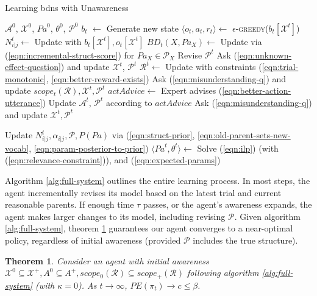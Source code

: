 \documentclass{article}
\newcommand{\bdn}{{\sc bdn}}
\newcommand{\Pa}{\mathit{Pa}}
\newtheorem{theorem}{Theorem}
\begin{document}
	\begin{algorithm}[t]
		\caption{Learning \bdn{}s with Unawareness}
		\label{alg:full-system}
		\begin{algorithmic}[1]
			 $\mathcal{A}^0$, $\mathcal{X}^0$, $\Pa^0$, $\theta^0$, $\mathcal{P}^0$
				\STATE $b_t$ $\gets$ Generate new state
				\STATE $\langle o_t, a_t, r_t \rangle \gets$ \textsc{$\epsilon$-greedy}($b_{t}[\mathcal{X}^t]$)
				\STATE $N^t_{i|j} \gets$ Update with $b_t[\mathcal{X}^t], o_t[\mathcal{X}^t]$
				\STATE $BD_t(X, \Pa_X) \gets$ Update via (\ref{eqn:incremental-struct-score}) for $\Pa_X \in \mathcal{P}_X$
					\STATE Revise $\mathcal{P}^t$
				\ENDIF
					\STATE Ask (\ref{eqn:unknown-effect-question}) and update $\mathcal{X}^t$, $\mathcal{P}^t$
				\ENDIF
				\STATE $\mathcal{R}^t \gets$ Update with constraints (\ref{eqn:trial-monotonic}, \ref{eqn:better-reward-exists})
					\STATE Ask (\ref{eqn:misunderstanding-q}) and update $scope_t(\mathcal{R}), \mathcal{X}^t, \mathcal{P}^t$
				\ENDIF
					\STATE $\mathit{actAdvice} \gets$ Expert advises (\ref{eqn:better-action-utterance})
					\STATE Update $\mathcal{A}^t$, $\mathcal{P}^t$ according to $\mathit{actAdvice}$
						\STATE Ask (\ref{eqn:misunderstanding-q}) and update $\mathcal{X}^t, \mathcal{P}^t$
						\ENDIF
				\ENDIF
				
					\STATE Update $N^t_{i|j}, \alpha_{i|j}, \mathcal{P}, P(\Pa)$ via (\ref{eqn:struct-prior},
					 \ref{eqn:old-parent-sets-new-vocab}, \ref{eqn:param-posterior-to-prior})
				\ENDIF
				\STATE $\langle \Pa^t, \theta^t \rangle \gets$ Solve (\ref{eqn:ilp}) (with (\ref{eqn:relevance-constraint})), and (\ref{eqn:expected-params})
				\ENDFOR
		\end{algorithmic}
	\end{algorithm}
	
	Algorithm \ref{alg:full-system} outlines the entire learning process. In most steps, the agent incrementally revises its model based on the latest trial and current reasonable parents. If enough time $\tau$ passes, or the agent's awareness expands, the agent makes larger changes to its model, including revising $\mathcal{P}$. Given algorithm \ref{alg:full-system}, theorem \ref{thm:full-unawareness-guarantee} guarantees our agent converges to a near-optimal policy, regardless of initial awareness  (provided $\mathcal{P}$ includes the true structure).
	\begin{theorem}
		\label{thm:full-unawareness-guarantee}
		Consider an agent with initial awareness $\mathcal{X}^0 \subseteq \mathcal{X}^+, A^0 \subseteq A^+ ,scope_0(\mathcal{R}) \subseteq scope_+(\mathcal{R})$ following algorithm \ref{alg:full-system} (with $\kappa = 0$). As $t \rightarrow \infty$, $PE(\pi_{t}) \rightarrow c \leq \beta$.
	\end{theorem}
			
\end{document}
